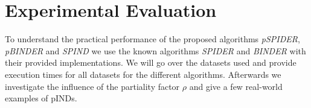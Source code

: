 \section{Experimental Evaluation}
To understand the practical performance of the proposed algorithms \textit{pSPIDER}, \textit{pBINDER} and \textit{SPIND} we use the known algorithms \textit{SPIDER} and \textit{BINDER} with their provided implementations. We will go over the datasets used and provide execution times for all datasets for the different algorithms. Afterwards we investigate the influence of the partiality factor $\rho$ and give a few real-world examples of pINDs.
